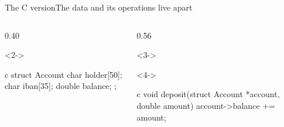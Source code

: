 \documentclass[\deckoptions]{beamer}
\begin{document}
\begin{frame}[fragile]{The C version}{The data and its operations live apart}
  \begin{columns}[T, onlytextwidth]
    \begin{column}{0.40\textwidth}
      \begin{uncoverenv}<2->
\begin{codeblock}[steps={||||none|none|}, compact]{c}
struct Account {
    char holder[50];
    char iban[35];
    double balance;
};
\end{codeblock}
      \end{uncoverenv}
    \end{column}
    \begin{column}{0.56\textwidth}
      \begin{uncoverenv}<3->
      \end{uncoverenv}
      \begin{uncoverenv}<4->
\begin{codeblock}[steps={1,5|2,6-7|}, steps from=5, compact, marks={1+5/5, 2+6-7/6}]{c}
void deposit(struct Account *account, double amount) {
    account->balance += amount;
}


\end{codeblock}
\end{uncoverenv}
\end{column}
\end{columns}
\end{frame}
\end{document}
